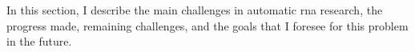 

In this section, I describe the main challenges in automatic
\gls{rna} research, the progress made, remaining challenges,
and the goals that I foresee for this problem in the future.
